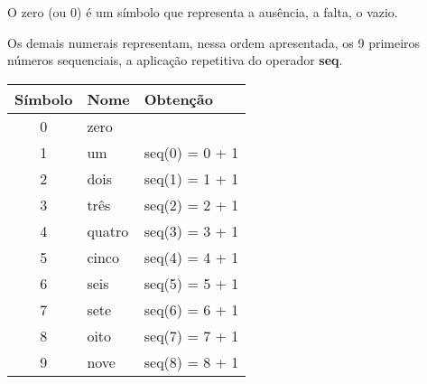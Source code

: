 O zero (ou 0) é um símbolo que representa a ausência, a falta, o vazio.

Os demais numerais representam, nessa ordem apresentada, os 9 primeiros números sequenciais, a aplicação repetitiva do operador \textbf{seq}.

\begin{center}
    \begin{tabular}{|c|l|l|}
        \hline
        Símbolo & Nome & Obtenção\\ \hline
        0 & zero   &                \\ \hline
        1 & um     & seq(0) = 0 + 1 \\ \hline
        2 & dois   & seq(1) = 1 + 1 \\ \hline
        3 & três   & seq(2) = 2 + 1 \\ \hline
        4 & quatro & seq(3) = 3 + 1 \\ \hline
        5 & cinco  & seq(4) = 4 + 1 \\ \hline
        6 & seis   & seq(5) = 5 + 1 \\ \hline
        7 & sete   & seq(6) = 6 + 1 \\ \hline
        8 & oito   & seq(7) = 7 + 1 \\ \hline
        9 & nove   & seq(8) = 8 + 1 \\ \hline
    \end{tabular}
\end{center}


